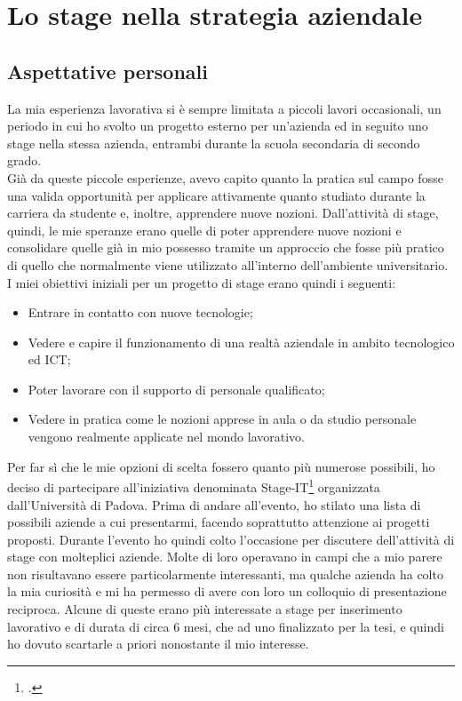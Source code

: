 
\chapter{Lo stage nella strategia aziendale}
\label{cap:lo stage nella strategia aziendale}

\section{Aspettative personali}
La mia esperienza lavorativa si è sempre limitata a piccoli lavori occasionali, un periodo in cui ho svolto un progetto esterno per un'azienda ed in seguito uno stage nella stessa azienda, entrambi durante la scuola secondaria di secondo grado.\\
Già da queste piccole esperienze, avevo capito quanto la pratica sul campo fosse una valida opportunità per applicare attivamente quanto studiato durante la carriera da studente e, inoltre, apprendere nuove nozioni. 
Dall'attività di stage, quindi, le mie speranze erano quelle di poter apprendere nuove nozioni e consolidare quelle già in mio possesso tramite un approccio che fosse più pratico di quello che normalmente viene utilizzato all'interno dell'ambiente universitario. \\
I miei obiettivi iniziali per un progetto di stage erano quindi i seguenti:
\begin{itemize}
	\item Entrare in contatto con nuove tecnologie;
	\item Vedere e capire il funzionamento di una realtà aziendale in ambito tecnologico ed ICT;
	\item Poter lavorare con il supporto di personale qualificato;
	\item Vedere in pratica come le nozioni apprese in aula o da studio personale vengono realmente applicate nel mondo lavorativo.
\end{itemize}
Per far sì che le mie opzioni di scelta fossero quanto più numerose possibili, ho deciso di partecipare all'iniziativa denominata Stage-IT\footcite{site:stageit} organizzata dall'Università di Padova. Prima di andare all'evento, ho stilato una lista di possibili aziende a cui presentarmi, facendo soprattutto attenzione ai progetti proposti. Durante l'evento ho quindi colto l'occasione per discutere dell'attività di stage con molteplici aziende. Molte di loro operavano in campi che a mio parere non risultavano essere particolarmente interessanti, ma qualche azienda ha colto la mia curiosità e mi ha permesso di avere con loro un colloquio di presentazione reciproca. Alcune di queste erano più interessate a stage per inserimento lavorativo e di durata di circa 6 mesi, che ad uno finalizzato per la tesi, e quindi ho dovuto scartarle a priori nonostante il mio interesse. \\
